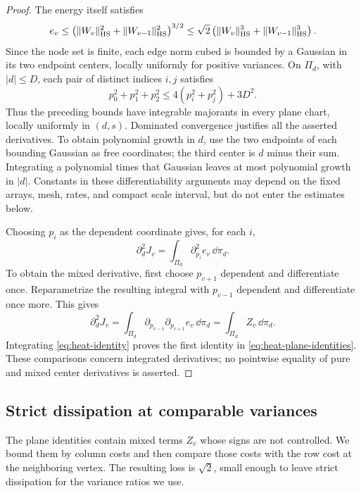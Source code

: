 \begin{proof}
The energy itself satisfies
\begin{equation}\label{eq:heat-energy-bound}
 e_v\le\left(\|W_v\|_{\mathrm{HS}}^2+
                  \|W_{v-1}\|_{\mathrm{HS}}^2\right)^{3/2}
 \le\sqrt2\left(\|W_v\|_{\mathrm{HS}}^3+
                       \|W_{v-1}\|_{\mathrm{HS}}^3\right).
\end{equation}
Since the node set is finite, each edge norm cubed is bounded by a
Gaussian in its two endpoint centers, locally uniformly for positive
variances.  On $\Pi_d$, with $|d|\le D$, each pair of distinct indices
$i,j$ satisfies
\[
 p_0^2+p_1^2+p_2^2\le4(p_i^2+p_j^2)+3D^2.
\]
Thus the preceding bounds have integrable majorants in every plane
chart, locally uniformly in $(d,s)$.  Dominated convergence justifies
all the asserted derivatives.  To obtain polynomial growth in $d$,
use the two endpoints of each bounding Gaussian as free coordinates;
the third center is $d$ minus their sum.  Integrating a polynomial times
that Gaussian leaves at most polynomial growth in $|d|$.  Constants in
these differentiability arguments may depend on the fixed arrays,
mesh, rates, and compact scale interval, but do not enter the estimates
below.

Choosing $p_i$ as the dependent coordinate gives, for each $i$,
\[
 \partial_d^2J_v=\int_{\Pi_d}\partial_{p_i}^2e_v\,\dd\pi_d.
\]
To obtain the mixed derivative, first choose $p_{v+1}$ dependent and
differentiate once.  Reparametrize the resulting integral with
$p_{v-1}$ dependent and differentiate once more.  This gives
\[
 \partial_d^2J_v
 =\int_{\Pi_d}\partial_{p_{v-1}}\partial_{p_{v+1}}e_v\,\dd\pi_d
 =\int_{\Pi_d}Z_v\,\dd\pi_d.
\]
Integrating \eqref{eq:heat-identity} proves the first identity in
\eqref{eq:heat-plane-identities}.  These comparisons concern integrated
derivatives; no pointwise equality of pure and mixed center derivatives
is asserted.
\end{proof}

\subsection{Strict dissipation at comparable variances}

The plane identities contain mixed terms $Z_v$ whose signs are not
controlled.  We bound them by column costs and then compare those costs
with the row cost at the neighboring vertex.  The resulting loss is
$\sqrt2$, small enough to leave strict dissipation for the variance
ratios we use.

